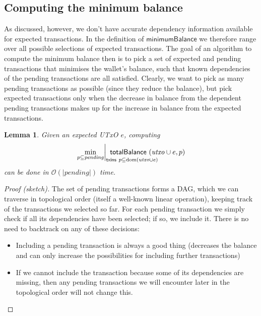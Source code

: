 \documentclass{article}
\newcommand{\order}[1]{\mathcal{O}\left(#1\right)}
\DeclareMathOperator{\dom}{dom}
\DeclareMathOperator*{\minimum}{min}
\newtheorem{lemma}{Lemma}[section] %
\numberwithin{equation}{lemma}
\begin{document}
\subsection{Computing the minimum balance}

As discussed, however, we don't have accurate dependency information available
for expected transactions. In the definition of $\mathsf{minimumBalance}$ we
therefore range over all possible selections of expected transactions.
The goal of an algorithm to compute the minimum balance then is to pick a set
of expected and pending transactions that minimises the wallet's balance, such
that known dependencies of the pending transactions are all satisfied.
Clearly, we want to pick as many pending transactions as possible (since they
reduce the balance), but pick expected transactions only when the decrease in
balance from the dependent pending transactions makes up for the increase in
balance from the expected transactions.

\begin{lemma}
Given an expected UTxO $e$, computing
%
\begin{equation*}
  \left.
  \minimum_{p \subseteq \mathit{pending}}
  \right|_{\mathrlap{\mathsf{txins} ~ p \subseteq \dom(\mathit{utxo} \cup e)}}
  ~ \mathsf{totalBalance} ~ (\mathit{utxo} \cup e, p)
\end{equation*}
%
can be done in $\order{|\mathit{pending}|}$ time.
\end{lemma}

\begin{proof}[Proof (sketch)]
The set of pending transactions forms a DAG, which we can traverse in
topological order (itself a well-known linear operation), keeping track of the
transactions we selected so far. For each pending transaction we simply check if
all its dependencies have been selected; if so, we include it. There is no need
to backtrack on any of these decisions:

\begin{itemize}
\item Including a pending transaction is always a good thing (decreases the
balance and can only increase the possibilities for  including further
transactions)
\item If we cannot include the transaction because some of its dependencies
are missing, then any pending transactions we will encounter later in the
topological order will not change this.
\end{itemize}
\end{proof}
\end{document}
